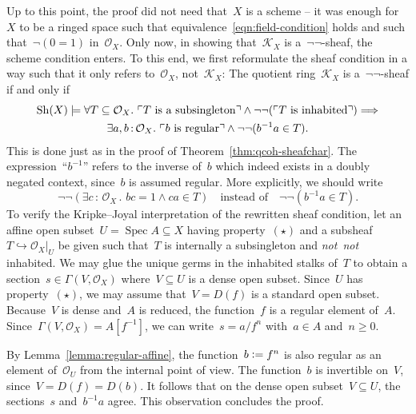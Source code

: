 \documentclass[10pt,reqno,a4paper]{amsbook}
\makeatletter
\theoremstyle{definition}
\theoremstyle{plain}
\theoremstyle{remark}
\renewcommand{\O}{\mathcal{O}}
\newcommand{\K}{\mathcal{K}}
\newcommand{\Sh}{\mathrm{Sh}}
\DeclareMathOperator{\Spec}{Spec}
\newcommand{\?}{\,{:}\,}
\renewcommand{\_}{\mathpunct{.}\,}
\newcommand{\speak}[1]{\ulcorner\text{\textnormal{#1}}\urcorner}
\newcommand{\notnot}{\emph{not~not}\xspace}
\newcommand{\defeq}{\vcentcolon=}
\renewenvironment{proof}[1][\proofname]{\par
  \pushQED{\qed}%
  \normalfont \topsep6\p@\@plus6\p@\relax
  \trivlist
  \item[\hskip\labelsep
        \itshape
    #1\@addpunct{.}]\ignorespaces
}{%
  \popQED\endtrivlist\@endpefalse
}
\makeatother
\begin{document}
\begin{proof}
Up to this point, the proof did not need that~$X$ is a scheme -- it was enough
for~$X$ to be a ringed space such that equivalence~\eqref{eqn:field-condition} holds and
such that~$\neg(0 = 1)$ in~$\O_X$. Only now, in showing that~$\K_X$ is
a~$\neg\neg$-sheaf, the scheme condition enters. To this end, we first
reformulate the sheaf condition in a way such that it only refers to~$\O_X$,
not~$\K_X$: The quotient ring~$\K_X$ is a~$\neg\neg$-sheaf if and only if
\begin{multline*}
  \Sh(X) \models \forall T \subseteq \O_X\_
  \speak{$T$ is a subsingleton} \wedge \neg\neg(\speak{$T$ is inhabited})
  \Longrightarrow \\
  \exists a,b\?\O_X\_ \speak{$b$ is regular} \wedge \neg\neg(b^{-1} a \in T).
\end{multline*}
This is done just as in the proof of Theorem~\ref{thm:qcoh-sheafchar}.
The expression~``$b^{-1}$'' refers to the inverse of~$b$ which indeed exists in a doubly
negated context, since~$b$ is assumed regular. More explicitly, we should write
\[ \neg\neg(\exists c\?\O_X\_ bc = 1 \wedge ca \in T)
  \quad\text{instead of}\quad
  \neg\neg(b^{-1} a \in T). \]
To verify the Kripke--Joyal interpretation of the rewritten sheaf condition, let
an affine open subset~$U = \Spec A \subseteq X$ having property~$(\star)$ and a subsheaf~$T
\hookrightarrow \O_X|_U$ be given such that~$T$ is internally a subsingleton
and \notnot inhabited. We may glue the unique germs in the inhabited
stalks of~$T$ to obtain a section~$s \in \Gamma(V,\O_X)$ where~$V \subseteq U$
is a dense open subset. Since~$U$ has property~$(\star)$, we may assume that~$V
= D(f)$ is a standard open subset. Because~$V$ is dense and~$A$ is reduced, the
function~$f$ is a regular element of~$A$.
Since~$\Gamma(V,\O_X) = A[f^{-1}]$, we can write~$s = a/f^n$ with~$a \in A$
and~$n \geq 0$.

By Lemma~\ref{lemma:regular-affine}, the function~$b \defeq f^n$ is also regular as an
element of~$\O_U$ from the internal point of view. The function~$b$ is invertible
on~$V$, since~$V = D(f) = D(b)$. It follows that on the dense
open subset~$V \subseteq U$, the sections~$s$ and~$b^{-1} a$ agree.
This observation concludes the proof.
\end{proof}
\end{document}
